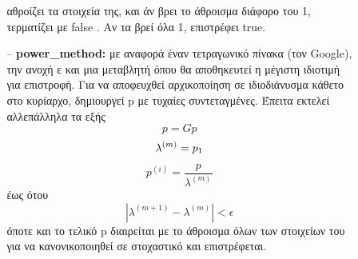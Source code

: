 \documentclass{article}
\newcommand{\lt}{\latintext}
\newcommand{\gt}{\greektext}
\begin{document}
\begin{itemize}
\begin{itemize}
\begin{itemize}
                            \gt αθροίζει τα στοιχεία της, και άν βρει το άθροισμα διάφορο του 1,
                            \gt τερματίζει με \lt false \gt. Αν τα βρεί όλα 1, επιστρέφει \lt true.
                    \item [--] \textbf{\lt power\_method:}
                             με αναφορά έναν τετραγωνικό πίνακα (τον \lt Google), 
                            \gt την ανοχή ε και μια μεταβλητή όπου θα αποθηκευτεί η μέγιστη
                            \gt ιδιοτιμή για επιστροφή. 
                            \gt Για να αποφευχθεί αρχικοποίηση σε ιδιοδιάνυσμα κάθετο
                            \gt στο κυρίαρχο, δημιουργεί \lt p \gt με τυχαίες συντεταγμένες.
                            \gt Έπειτα εκτελεί αλλεπάλληλα τα εξής
                            \begin{equation}
                                p = Gp
                            \end{equation}
                            \begin{equation}
                                \lambda^{(m)} = p_{1}\\
                            \end{equation}
                            \begin{equation}
                                p^{(i)} = \frac{p}{\lambda^{(m)}}
                            \end{equation}
                            \gt έως ότου 
                            \begin{equation*}
                                \left| \lambda^{(m+1)} - \lambda^{(m)}\right| < \epsilon
                            \end{equation*}
                            \gt όποτε και το τελικό \lt p \gt διαιρείται με το άθροισμα όλων των
                            \gt στοιχείων του για να κανονικοποιηθεί σε στοχαστικό και επιστρέφεται.
                \end{itemize}
            \end{itemize}   
            
\end{itemize}

\end{document}
